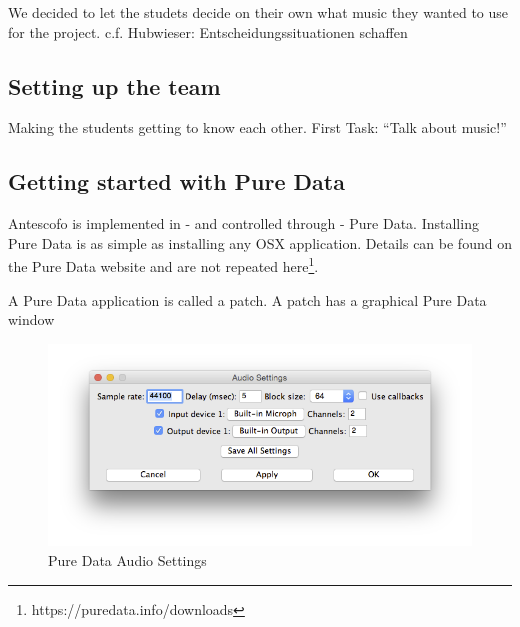 \documentclass[onecolumn,nocopyrightspace,preprint]{sigplanconf}
\begin{document}
We decided to let the studets decide on their own what music they wanted to use for the project.
c.f. Hubwieser: Entscheidungssituationen schaffen


\subsection{Setting up the team}

Making the students getting to know each other. First Task: ``Talk about music!''

\subsection{Getting started with Pure Data}


Antescofo is implemented in - and controlled through - Pure Data.
Installing Pure Data is as simple as installing any OSX application. Details can be found
on the Pure Data website and are not repeated here\footnote{https://puredata.info/downloads}.

A Pure Data application is called a patch. A patch has a graphical Pure Data window



\begin{figure}[ht]
    \centering
    \includegraphics[scale=0.4]{fig/pd-audio.png}
    \caption{Pure Data Audio Settings}
    \label{fig:pd-audio}
\end{figure}
\end{document}
